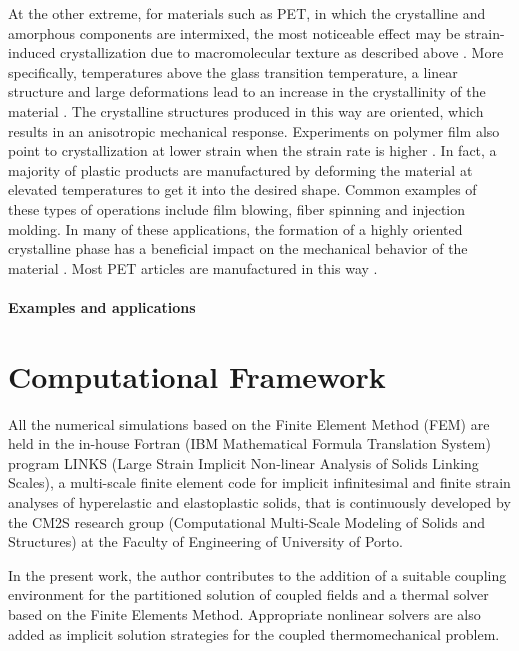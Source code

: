 At the other extreme, for materials such as PET, in which the crystalline and amorphous components are intermixed, the most noticeable effect may be strain-induced crystallization due to macromolecular texture as described above \citep{wardIntroductionMechanicalProperties2004}.
More specifically, temperatures above the glass transition temperature, a linear structure and large deformations lead to an increase in the crystallinity of the material \citep{ahziModelingDeformationBehavior2003}.
The crystalline structures produced in this way are oriented, which results in an anisotropic mechanical response.
Experiments on polymer film also point to crystallization at lower strain when the strain rate is higher \citep{raoStudyStraininducedCrystallization2001}.
In fact,  a majority of plastic products are manufactured by deforming the material at elevated temperatures to get it into the desired shape.
Common examples of these types of operations include film blowing, fiber spinning and injection molding.
In many of these applications, the formation of a highly oriented crystalline phase has a beneficial impact on the mechanical behavior of the material \citep{dairaniehPhenomenologicalModelFlowInduced1999, raoStudyStraininducedCrystallization2001}.
Most PET articles are manufactured in this way \citep{boyceConstitutiveModelFinite2000, raoStudyStraininducedCrystallization2001, makradiTwophaseSelfconsistentModel2005}.

\paragraph{Examples and applications}


\section{Computational Framework}

All the numerical simulations based on the Finite Element Method (FEM) are held in the in-house Fortran (IBM Mathematical Formula Translation System) program LINKS (Large Strain Implicit Non-linear Analysis of Solids Linking Scales), a multi-scale finite element code for implicit infinitesimal and finite strain analyses of hyperelastic and elastoplastic solids, that is continuously developed by the CM2S research group (Computational Multi-Scale Modeling of Solids and Structures) at the Faculty of Engineering of University of Porto.

In the present work, the author contributes to the addition of a suitable coupling environment for the partitioned solution of coupled fields and a thermal solver based on the Finite Elements Method.
Appropriate nonlinear solvers are also added as implicit solution strategies for the coupled thermomechanical problem.

